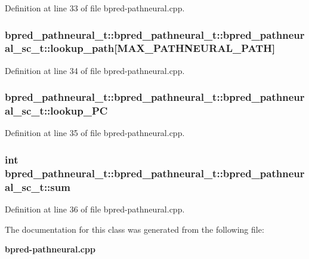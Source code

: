 Definition at line 33 of file bpred-pathneural.cpp.
\subsubsection[{lookup\_\-path}]{ bpred\_\-pathneural\_\-t::bpred\_\-pathneural\_\-t::bpred\_\-pathneural\_\-sc\_\-t::lookup\_\-path[MAX\_\-PATHNEURAL\_\-PATH]}\label{classbpred__pathneural__t_1_1bpred__pathneural__sc__t_bce8ed77056bd2d1bb41665b47fdbcb4}




Definition at line 34 of file bpred-pathneural.cpp.
\subsubsection[{lookup\_\-PC}]{ bpred\_\-pathneural\_\-t::bpred\_\-pathneural\_\-t::bpred\_\-pathneural\_\-sc\_\-t::lookup\_\-PC}\label{classbpred__pathneural__t_1_1bpred__pathneural__sc__t_af1da1cb9ade33f79e4360017bea48cd}




Definition at line 35 of file bpred-pathneural.cpp.
\subsubsection[{sum}]{\setlength{\rightskip}{0pt plus 5cm}int bpred\_\-pathneural\_\-t::bpred\_\-pathneural\_\-t::bpred\_\-pathneural\_\-sc\_\-t::sum}\label{classbpred__pathneural__t_1_1bpred__pathneural__sc__t_b13871f189e1df8439860e848d19eb4b}




Definition at line 36 of file bpred-pathneural.cpp.

The documentation for this class was generated from the following file:\begin{CompactItemize}
\item 
{\bf bpred-pathneural.cpp}\end{CompactItemize}
